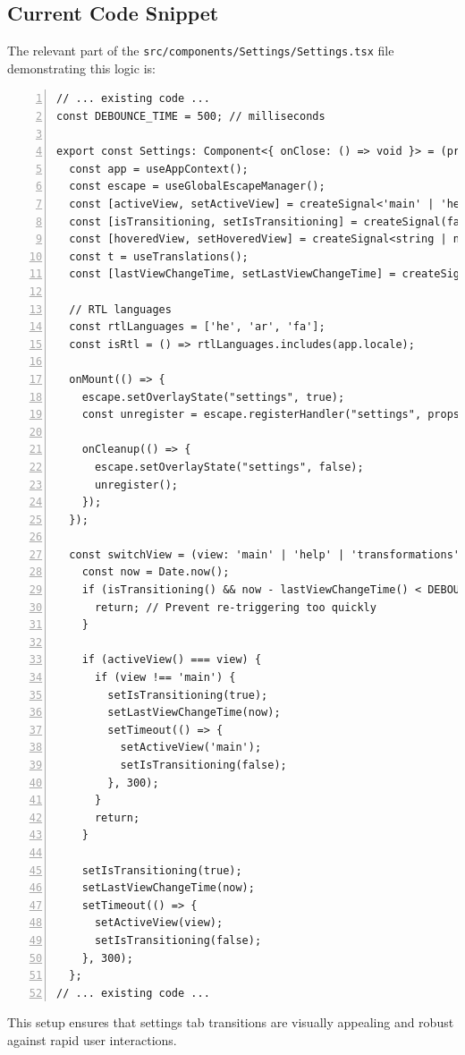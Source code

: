 \documentclass[10pt]{article}
\begin{document}
\subsection{Current Code Snippet}

The relevant part of the \texttt{src/components/Settings/Settings.tsx} file demonstrating this logic is:

\begin{Verbatim}[frame=lines, numbers=left, tabsize=2, fontsize=\small, xleftmargin=1em, xrightmargin=1em, breaklines=true]
// ... existing code ...
const DEBOUNCE_TIME = 500; // milliseconds

export const Settings: Component<{ onClose: () => void }> = (props) => {
  const app = useAppContext();
  const escape = useGlobalEscapeManager();
  const [activeView, setActiveView] = createSignal<'main' | 'help' | 'transformations' | 'experimental' | 'tagger' | 'captioners' | 'captionTypes' | 'tagsAndSuggestions' | 'boundingBox' | 'performance' | 'danger' | 'versionControl' | 'assistant'>('main');
  const [isTransitioning, setIsTransitioning] = createSignal(false);
  const [hoveredView, setHoveredView] = createSignal<string | null>(null);
  const t = useTranslations();
  const [lastViewChangeTime, setLastViewChangeTime] = createSignal(0);

  // RTL languages
  const rtlLanguages = ['he', 'ar', 'fa'];
  const isRtl = () => rtlLanguages.includes(app.locale);

  onMount(() => {
    escape.setOverlayState("settings", true);
    const unregister = escape.registerHandler("settings", props.onClose);

    onCleanup(() => {
      escape.setOverlayState("settings", false);
      unregister();
    });
  });

  const switchView = (view: 'main' | 'help' | 'transformations' | 'experimental' | 'tagger' | 'captioners' | 'captionTypes' | 'tagsAndSuggestions' | 'boundingBox' | 'performance' | 'danger' | 'versionControl' | 'assistant') => {
    const now = Date.now();
    if (isTransitioning() && now - lastViewChangeTime() < DEBOUNCE_TIME) {
      return; // Prevent re-triggering too quickly
    }

    if (activeView() === view) {
      if (view !== 'main') {
        setIsTransitioning(true);
        setLastViewChangeTime(now);
        setTimeout(() => {
          setActiveView('main');
          setIsTransitioning(false);
        }, 300);
      }
      return;
    }

    setIsTransitioning(true);
    setLastViewChangeTime(now);
    setTimeout(() => {
      setActiveView(view);
      setIsTransitioning(false);
    }, 300);
  };
// ... existing code ...
\end{Verbatim}

This setup ensures that settings tab transitions are visually appealing and robust against rapid user interactions.
\end{document}
